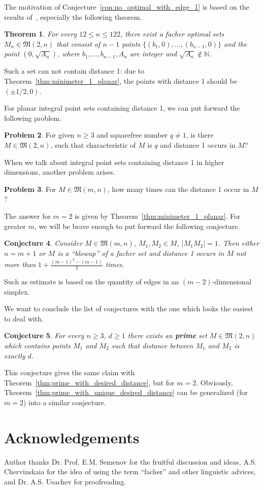 \documentclass[a4paper,14pt]{article} %
\theoremstyle{plain}
\newtheorem{theorem}{Theorem}[section]
\newtheorem{conjecture}[theorem]{Conjecture}
\theoremstyle{definition}
\newtheorem{problem}[theorem]{Problem}
\begin{document}
The motivation of Conjecture~\ref{con:no_optimal_with_edge_1} is based on the results of~\cite[Section 5]{kurz2008minimum},
especially the following theorem.

\begin{theorem}
	For every $12 \leq n \leq 122$, there exist a facher optimal sets $M_n\in\mathfrak{M}(2,n)$
	that consist of $n-1$ points $\{ (b_1,0), ..., (b_{n-1},0)\}$
	and the point $(0,\sqrt{A_n})$,
	where $b_1,...,b_{n-1}, A_n$ are integer and $\sqrt{A_n}\notin\mathbb{N}$.
\end{theorem}
Such a set can not contain distance 1: due to Theorem~\ref{thm:minimeter_1_planar},
the points with distance 1 should be $(\pm 1/2, 0)$.

For planar integral point sets containing distance 1, we can put forward the following problem.
\begin{problem}
	For given $n\geq 3$ and squarefree number $q \neq 1$,
	is there $M\in\mathfrak{M}(2,n)$, such that characteristic of $M$ is $q$
	and distance 1 occurs in $M$?
\end{problem}

When we talk about integral point sets containing distance 1 in higher dimensions, another problem arises.

\begin{problem}
	For $M\in\mathfrak{M}(m,n)$, how many times can the distance 1 occur in $M$?
\end{problem}
The answer for $m=2$ is given by Theorem~\ref{thm:minimeter_1_planar}.
For greater $m$, we will be brave enough to put forward the following conjecture.
\begin{conjecture}
	Consider $M\in\mathfrak{M}(m,n)$, $M_1,M_2\in M$, $|M_1 M_2| =1$.
	Then either $n = m+1$ or $M$ is a ``blowup'' of a facher set and distance 1 occurs in $M$
	not more than $1+\frac{(m-1)^2 - (m-1)}{2}$ times.
\end{conjecture}
Such as estimate is based on the quantity of edges in an $(m-2)$-dimensional simplex.

We want to conclude the list of conjectures with the one which looks the easiest to deal with.


\begin{conjecture}
	\label{hyp:prime_planar}
	For every $n \geq 3$, $d \geq 1$ there exists an \textbf{prime}
	set $M\in\mathfrak{M}(2,n)$ which
	contains points $M_1$ and $M_2$ such that distance between $M_1$ and $M_2$ is exactly $d$.
\end{conjecture}
This conjecture gives the same claim with Theorem~\ref{thm:prime_with_desired_distance}, but for $m=2$.
Obviously, Theorem~\ref{thm:prime_with_unique_desired_distance} can be generalized (for $m=2$) into a similar conjecture.


\section{Acknowledgements}
Author thanks Dr. Prof. E.M. Semenov for the fruitful discussion and ideas,
A.S. Chervinskaia for the idea of using the term ``facher'' and other linguistic advices,
and Dr. A.S. Usachev for proofreading.


\printbibliography
\end{document}

